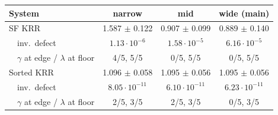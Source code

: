 \begin{tabular}{lccc}
\toprule
System & narrow & mid & wide (main) \\
\midrule
SF KRR & 1.587 $\pm$ 0.122 & 0.907 $\pm$ 0.099 & 0.889 $\pm$ 0.140 \\
\ \ inv.\ defect & $1.13\cdot10^{-6}$ & $1.58\cdot10^{-5}$ & $6.16\cdot10^{-5}$ \\
\ \ $\gamma$ at edge / $\lambda$ at floor & 4/5, 5/5 & 0/5, 5/5 & 0/5, 5/5 \\
Sorted KRR & 1.096 $\pm$ 0.058 & 1.095 $\pm$ 0.056 & 1.095 $\pm$ 0.056 \\
\ \ inv.\ defect & $8.05\cdot10^{-11}$ & $6.10\cdot10^{-11}$ & $6.23\cdot10^{-11}$ \\
\ \ $\gamma$ at edge / $\lambda$ at floor & 2/5, 3/5 & 2/5, 3/5 & 0/5, 3/5 \\
\bottomrule
\end{tabular}